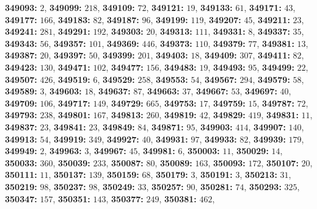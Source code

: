\textsf{\bfseries 349093:} $2$, \textsf{\bfseries 349099:} $218$, \textsf{\bfseries 349109:} $72$, \textsf{\bfseries 349121:} $19$, \textsf{\bfseries 349133:} $61$, \textsf{\bfseries 349171:} $43$, \textsf{\bfseries 349177:} $166$, \textsf{\bfseries 349183:} $82$, \textsf{\bfseries 349187:} $96$, \textsf{\bfseries 349199:} $119$, \textsf{\bfseries 349207:} $45$, \textsf{\bfseries 349211:} $23$, \textsf{\bfseries 349241:} $281$, \textsf{\bfseries 349291:} $192$, \textsf{\bfseries 349303:} $20$, \textsf{\bfseries 349313:} $111$, \textsf{\bfseries 349331:} $8$, \textsf{\bfseries 349337:} $35$, \textsf{\bfseries 349343:} $56$, \textsf{\bfseries 349357:} $101$, \textsf{\bfseries 349369:} $446$, \textsf{\bfseries 349373:} $110$, \textsf{\bfseries 349379:} $77$, \textsf{\bfseries 349381:} $13$, \textsf{\bfseries 349387:} $20$, \textsf{\bfseries 349397:} $50$, \textsf{\bfseries 349399:} $201$, \textsf{\bfseries 349403:} $18$, \textsf{\bfseries 349409:} $307$, \textsf{\bfseries 349411:} $82$, \textsf{\bfseries 349423:} $130$, \textsf{\bfseries 349471:} $102$, \textsf{\bfseries 349477:} $156$, \textsf{\bfseries 349483:} $19$, \textsf{\bfseries 349493:} $95$, \textsf{\bfseries 349499:} $22$, \textsf{\bfseries 349507:} $426$, \textsf{\bfseries 349519:} $6$, \textsf{\bfseries 349529:} $258$, \textsf{\bfseries 349553:} $54$, \textsf{\bfseries 349567:} $294$, \textsf{\bfseries 349579:} $58$, \textsf{\bfseries 349589:} $3$, \textsf{\bfseries 349603:} $18$, \textsf{\bfseries 349637:} $87$, \textsf{\bfseries 349663:} $37$, \textsf{\bfseries 349667:} $53$, \textsf{\bfseries 349697:} $40$, \textsf{\bfseries 349709:} $106$, \textsf{\bfseries 349717:} $149$, \textsf{\bfseries 349729:} $665$, \textsf{\bfseries 349753:} $17$, \textsf{\bfseries 349759:} $15$, \textsf{\bfseries 349787:} $72$, \textsf{\bfseries 349793:} $238$, \textsf{\bfseries 349801:} $167$, \textsf{\bfseries 349813:} $260$, \textsf{\bfseries 349819:} $42$, \textsf{\bfseries 349829:} $419$, \textsf{\bfseries 349831:} $11$, \textsf{\bfseries 349837:} $23$, \textsf{\bfseries 349841:} $23$, \textsf{\bfseries 349849:} $84$, \textsf{\bfseries 349871:} $95$, \textsf{\bfseries 349903:} $414$, \textsf{\bfseries 349907:} $140$, \textsf{\bfseries 349913:} $54$, \textsf{\bfseries 349919:} $349$, \textsf{\bfseries 349927:} $40$, \textsf{\bfseries 349931:} $97$, \textsf{\bfseries 349933:} $82$, \textsf{\bfseries 349939:} $179$, \textsf{\bfseries 349949:} $2$, \textsf{\bfseries 349963:} $3$, \textsf{\bfseries 349967:} $45$, \textsf{\bfseries 349981:} $6$, \textsf{\bfseries 350003:} $11$, \textsf{\bfseries 350029:} $14$, \textsf{\bfseries 350033:} $360$, \textsf{\bfseries 350039:} $233$, \textsf{\bfseries 350087:} $80$, \textsf{\bfseries 350089:} $163$, \textsf{\bfseries 350093:} $172$, \textsf{\bfseries 350107:} $20$, \textsf{\bfseries 350111:} $11$, \textsf{\bfseries 350137:} $139$, \textsf{\bfseries 350159:} $68$, \textsf{\bfseries 350179:} $3$, \textsf{\bfseries 350191:} $3$, \textsf{\bfseries 350213:} $31$, \textsf{\bfseries 350219:} $98$, \textsf{\bfseries 350237:} $98$, \textsf{\bfseries 350249:} $33$, \textsf{\bfseries 350257:} $90$, \textsf{\bfseries 350281:} $74$, \textsf{\bfseries 350293:} $325$, \textsf{\bfseries 350347:} $157$, \textsf{\bfseries 350351:} $143$, \textsf{\bfseries 350377:} $249$, \textsf{\bfseries 350381:} $462$, 
